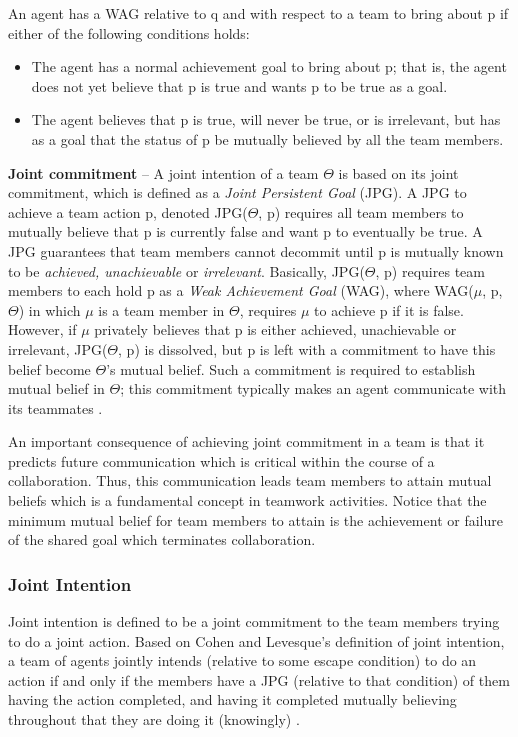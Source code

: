\documentclass[12pt]{report}
\begin{document}
An agent has a WAG relative to q and with respect to a team to bring about p if
either of the following conditions holds:

\begin{itemize}
  \item The agent has a normal achievement goal to bring about p; that is, the
  agent does not yet believe that p is true and wants p to be true as a goal.
  \item The agent believes that p is true, will never be true, or is irrelevant,
  but has as a goal that the status of p be mutually believed by all the team
  members.
\end{itemize}

\textbf{Joint commitment} -- A joint intention of a team $\Theta$ is based on
its joint commitment, which is defined as a \textit{Joint Persistent Goal}
(JPG). A JPG to achieve a team action p, denoted JPG($\Theta$, p) requires all
team members to mutually believe that p is currently false and want p to
eventually be true. A JPG guarantees that team members cannot decommit until p
is mutually known to be \textit{achieved, unachievable} or \textit{irrelevant}.
Basically, JPG($\Theta$, p) requires team members to each hold p as a
\textit{Weak Achievement Goal} (WAG), where WAG($\mu$, p, $\Theta$) in which
$\mu$ is a team member in $\Theta$, requires $\mu$ to achieve p if it is false.
However, if $\mu$ privately believes that p is either achieved, unachievable or
irrelevant, JPG($\Theta$, p) is dissolved, but p is left with a commitment to
have this belief become $\Theta$'s mutual belief. Such a commitment is required
to establish mutual belief in $\Theta$; this commitment typically makes an agent
communicate with its teammates \cite{cohen:teamwork}.

An important consequence of achieving joint commitment in a team is that it
predicts future communication which is critical within the course of a
collaboration. Thus, this communication leads team members to attain mutual
beliefs which is a fundamental concept in teamwork activities. Notice that
the minimum mutual belief for team members to attain is the achievement or
failure of the shared goal which terminates collaboration.

\subsubsection{Joint Intention}

Joint intention is defined to be a joint commitment to the team members trying
to do a joint action. Based on Cohen and Levesque's definition of joint
intention, a team of agents jointly intends (relative to some escape condition)
to do an action if and only if the members have a JPG (relative to that
condition) of them having the action completed, and having it completed
mutually believing throughout that they are doing it (knowingly)
\cite{cohen:teamwork}.
\end{document}
